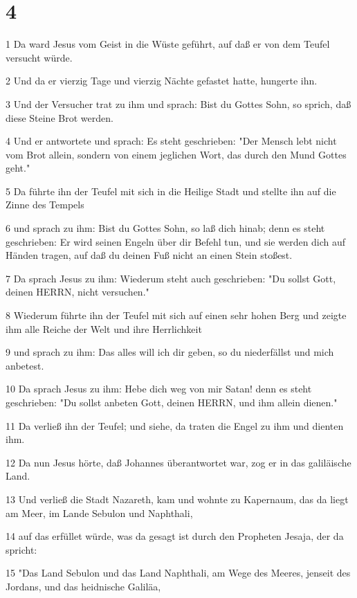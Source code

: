 \chapter{4}

\par 1 Da ward Jesus vom Geist in die Wüste geführt, auf daß er von dem Teufel versucht würde.
\par 2 Und da er vierzig Tage und vierzig Nächte gefastet hatte, hungerte ihn.
\par 3 Und der Versucher trat zu ihm und sprach: Bist du Gottes Sohn, so sprich, daß diese Steine Brot werden.
\par 4 Und er antwortete und sprach: Es steht geschrieben: "Der Mensch lebt nicht vom Brot allein, sondern von einem jeglichen Wort, das durch den Mund Gottes geht."
\par 5 Da führte ihn der Teufel mit sich in die Heilige Stadt und stellte ihn auf die Zinne des Tempels
\par 6 und sprach zu ihm: Bist du Gottes Sohn, so laß dich hinab; denn es steht geschrieben: Er wird seinen Engeln über dir Befehl tun, und sie werden dich auf Händen tragen, auf daß du deinen Fuß nicht an einen Stein stoßest.
\par 7 Da sprach Jesus zu ihm: Wiederum steht auch geschrieben: "Du sollst Gott, deinen HERRN, nicht versuchen."
\par 8 Wiederum führte ihn der Teufel mit sich auf einen sehr hohen Berg und zeigte ihm alle Reiche der Welt und ihre Herrlichkeit
\par 9 und sprach zu ihm: Das alles will ich dir geben, so du niederfällst und mich anbetest.
\par 10 Da sprach Jesus zu ihm: Hebe dich weg von mir Satan! denn es steht geschrieben: "Du sollst anbeten Gott, deinen HERRN, und ihm allein dienen."
\par 11 Da verließ ihn der Teufel; und siehe, da traten die Engel zu ihm und dienten ihm.
\par 12 Da nun Jesus hörte, daß Johannes überantwortet war, zog er in das galiläische Land.
\par 13 Und verließ die Stadt Nazareth, kam und wohnte zu Kapernaum, das da liegt am Meer, im Lande Sebulon und Naphthali,
\par 14 auf das erfüllet würde, was da gesagt ist durch den Propheten Jesaja, der da spricht:
\par 15 "Das Land Sebulon und das Land Naphthali, am Wege des Meeres, jenseit des Jordans, und das heidnische Galiläa,
